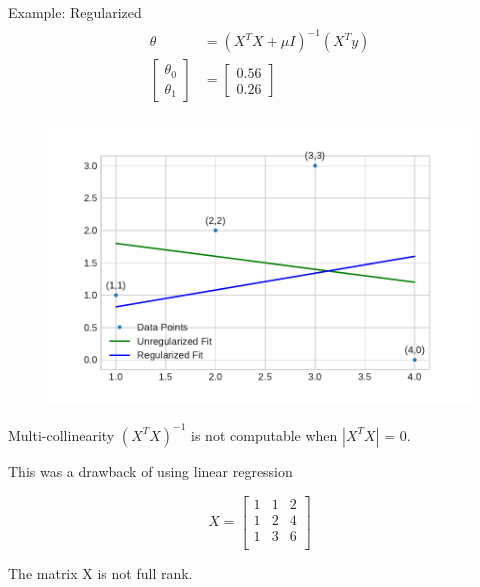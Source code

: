 \documentclass{beamer}
\begin{document}
\begin{frame}{Example: Regularized}
\vspace{0.4cm}
\begin{align*}
\begin{split}
\theta &= (X^{T}X+\mu I)^{-1}(X^{T}y) \\
\begin{bmatrix}
\theta_{0}\\
\theta_{1}
\end{bmatrix} &= 
\begin{bmatrix}
0.56\\
0.26
\end{bmatrix} 
\end{split}
\end{align*}
\vspace{-0.8cm}
\begin{figure}
\includegraphics[width=0.8\linewidth]{ridge/q_reg.pdf}
\end{figure}
\end{frame}

\begin{frame}{Multi-collinearity}
$(X^{T}X)^{-1}$ is not computable when $|X^{T}X|$ = 0.

This was a drawback of using linear regression

\begin{equation*}
X = \begin{bmatrix}
1 & 1& 2\\
1 & 2& 4\\
1 & 3& 6\\
\end{bmatrix}
\end{equation*}

The matrix X is not full rank. 
\end{frame}
\end{document}
